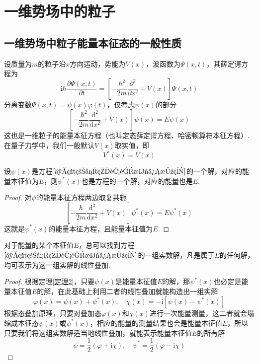 \section{一维势场中的粒子}

\subsection{一维势场中粒子能量本征态的一般性质}

设质量为$m$的粒子沿$x$方向运动，势能为$V(x)$，波函数为$\Psi(x,t)$，其薛定谔方程为
\begin{equation}\label{薛定谔方程}
    \mathrm{i}\hbar\frac{\partial \Psi(x,t)}{\partial t} = \left[-\frac{\hbar^2}{2m}\frac{\partial^2 }{\partial x^2}+V(x)\right]\Psi(x,t)
\end{equation}
分离变数$\Psi(x,t)=\psi(x)\varphi(t)$，仅考虑$\psi(x)$的部分
\begin{equation}\label{一维粒子的能量本征方程}
    \left[-\frac{\hbar^2}{2m}\frac{\mathrm{d}^2}{\mathrm{d}x^2}+V(x)\right]\psi(x)=E\psi(x)
\end{equation}
这也是一维粒子的能量本征方程（也叫定态薛定谔方程、哈密顿算符本征方程）. 在量子力学中，我们一般默认$V(x)$取实值，即
\begin{equation}\label{量子力学中的势能是实数}
    V^*(x) = V(x)
\end{equation}



\begin{theorem}\label{定理1}
    设$\psi(x)$是方程$\eqref{一维粒子的能量本征方程}$的一个解，对应的能量本征值为$E$，则$\psi^*(x)$也是方程的一个解，对应的能量也是$E$.
\end{theorem}
\begin{proof}
    对$\psi$的能量本征方程两边取复共轭
    $$
        \left[-\frac{\hbar}{2m}\frac{\mathrm{d}^2}{\mathrm{d}x^2}+V(x)\right]\psi^*(x)=E\psi^*(x)
    $$
    这就是$\psi^*(x)$的能量本征方程，且能量本征值为$E$.
\end{proof}





\begin{theorem}\label{定理2}
    对于能量的某个本征值$E$，总可以找到方程$\eqref{一维粒子的能量本征方程}$的一组实数解，凡是属于$E$的任何解，均可表示为这一组实解的线性叠加.
\end{theorem}
\begin{proof}
    根据定理\ref{定理2}，只要$\psi(x)$是能量本征值$E$的解，那$\psi^*(x)$也必定是能量本征值$E$的解，在此基础上利用二者的线性叠加就能构造出一组实解
    $$
        \varphi(x)=\psi(x)+\psi^*(x), \quad
        \chi(x) = -\mathrm{i}[\psi(x)-\psi^*(x)]
    $$
    根据态叠加原理，只要对叠加态$\varphi(x)$和$\chi(x)$进行一次能量测量，这二者就会塌缩成本征态$\psi(x)$或$\psi^*(x)$，相应的能量的测量结果也会是能量本征值$E$，所以只要我们将这组实数解适当地线性叠加，就能表示能量本征值$E$的所有解
    $$
        \psi=\frac{1}{2}(\varphi+\mathrm{i}\chi), \quad
        \psi^*=\frac{1}{2}(\varphi-\mathrm{i}\chi)
    $$
\end{proof}



